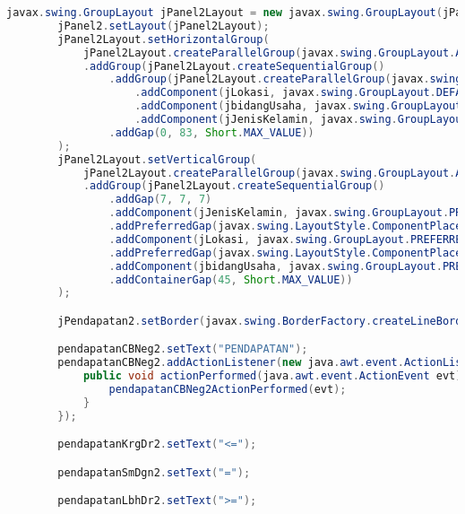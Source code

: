 \begin{lstlisting}[language=Java, caption=TampilanKondisiKetetanggaan.java]
        javax.swing.GroupLayout jPanel2Layout = new javax.swing.GroupLayout(jPanel2);
        jPanel2.setLayout(jPanel2Layout);
        jPanel2Layout.setHorizontalGroup(
            jPanel2Layout.createParallelGroup(javax.swing.GroupLayout.Alignment.LEADING)
            .addGroup(jPanel2Layout.createSequentialGroup()
                .addGroup(jPanel2Layout.createParallelGroup(javax.swing.GroupLayout.Alignment.LEADING, false)
                    .addComponent(jLokasi, javax.swing.GroupLayout.DEFAULT_SIZE, javax.swing.GroupLayout.DEFAULT_SIZE, Short.MAX_VALUE)
                    .addComponent(jbidangUsaha, javax.swing.GroupLayout.DEFAULT_SIZE, javax.swing.GroupLayout.DEFAULT_SIZE, Short.MAX_VALUE)
                    .addComponent(jJenisKelamin, javax.swing.GroupLayout.PREFERRED_SIZE, javax.swing.GroupLayout.DEFAULT_SIZE, javax.swing.GroupLayout.PREFERRED_SIZE))
                .addGap(0, 83, Short.MAX_VALUE))
        );
        jPanel2Layout.setVerticalGroup(
            jPanel2Layout.createParallelGroup(javax.swing.GroupLayout.Alignment.LEADING)
            .addGroup(jPanel2Layout.createSequentialGroup()
                .addGap(7, 7, 7)
                .addComponent(jJenisKelamin, javax.swing.GroupLayout.PREFERRED_SIZE, javax.swing.GroupLayout.DEFAULT_SIZE, javax.swing.GroupLayout.PREFERRED_SIZE)
                .addPreferredGap(javax.swing.LayoutStyle.ComponentPlacement.UNRELATED)
                .addComponent(jLokasi, javax.swing.GroupLayout.PREFERRED_SIZE, javax.swing.GroupLayout.DEFAULT_SIZE, javax.swing.GroupLayout.PREFERRED_SIZE)
                .addPreferredGap(javax.swing.LayoutStyle.ComponentPlacement.UNRELATED)
                .addComponent(jbidangUsaha, javax.swing.GroupLayout.PREFERRED_SIZE, javax.swing.GroupLayout.DEFAULT_SIZE, javax.swing.GroupLayout.PREFERRED_SIZE)
                .addContainerGap(45, Short.MAX_VALUE))
        );

        jPendapatan2.setBorder(javax.swing.BorderFactory.createLineBorder(new java.awt.Color(0, 0, 0)));

        pendapatanCBNeg2.setText("PENDAPATAN");
        pendapatanCBNeg2.addActionListener(new java.awt.event.ActionListener() {
            public void actionPerformed(java.awt.event.ActionEvent evt) {
                pendapatanCBNeg2ActionPerformed(evt);
            }
        });

        pendapatanKrgDr2.setText("<=");

        pendapatanSmDgn2.setText("=");

        pendapatanLbhDr2.setText(">=");


\end{lstlisting}
